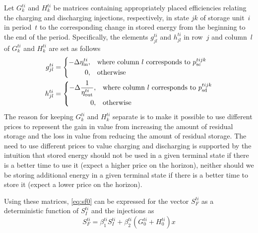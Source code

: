\documentclass[12pt]{article}
\numberwithin{equation}{section}
\numberwithin{table}{section}
\numberwithin{figure}{section}
\begin{document}
Let $G_k^{ti}$ and $H_k^{ti}$ be matrices containing appropriately placed efficiencies relating the charging and discharging injections, respectively, in state $jk$ of storage unit~$i$ in period~$t$ to the corresponding change in stored energy from the beginning to the end of the period. Specifically, the elements $g_{jl}^{ti}$ and  $h_{jl}^{ti}$ in row~$j$ and column~$l$ of $G_k^{ti}$ and $H_k^{ti}$ are set as follows
\begin{align}
g_{jl}^{ti} &= \left\{
\begin{aligned}
-\Delta \eta^{ti}_{\rm in}, \quad & \text{where column~} l \text{~corresponds to~} p_{\rm sc}^{tijk} \\
0, \quad & \text{otherwise}
\end{aligned}
\right. \\
h_{jl}^{ti} &= \left\{
\begin{aligned}
-\Delta \frac{1}{\eta^{ti}_{\rm out}}, \quad & \text{where column~} l \text{~corresponds to~} p_{\rm sd}^{tijk} \\
0, \quad & \text{otherwise}
\end{aligned}
\right.
\end{align}
The reason for keeping $G_k^{ti}$ and $H_k^{ti}$ separate is to make it possible to use different prices to represent the gain in value from increasing the amount of residual storage and the loss in value from reducing the amount of residual storage. The need to use different prices to value charging and discharging is supported by the intuition that stored energy should not be used in a given terminal state if there is a better time to use it (expect a higher price on the horizon), neither should we be storing additional energy in a given terminal state if there is a better time to store it (expect a lower price on the horizon).

Using these matrices, \eqref{eq:sf0} can be expressed for the vector $S_F^{ti}$ as a deterministic function of $S_I^{ti}$ and the injections as
\begin{equation}
S_F^{ti} = \beta_1^{ti} S_I^{ti} + \beta_2^{ti} (G_0^{ti} + H_0^{ti}) x \label{eq:sf}
\end{equation}
\end{document}
